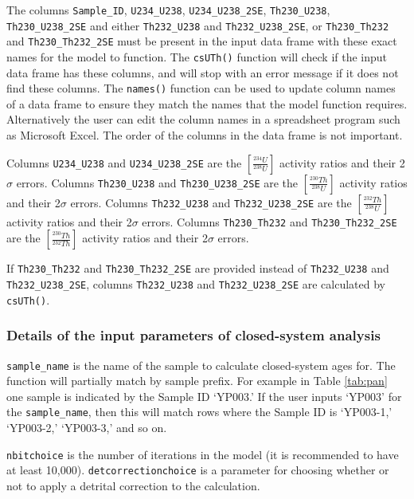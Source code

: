 \documentclass[]{elsarticle} %
\begin{document}
The columns \texttt{Sample\_ID}, \texttt{U234\_U238}, \texttt{U234\_U238\_2SE}, \texttt{Th230\_U238}, \texttt{Th230\_U238\_2SE} and either \texttt{Th232\_U238} and \texttt{Th232\_U238\_2SE}, or \texttt{Th230\_Th232} and \texttt{Th230\_Th232\_2SE} must be present in the input data frame with these exact names for the model to function. The \texttt{csUTh()} function will check if the input data frame has these columns, and will stop with an error message if it does not find these columns. The \texttt{names()} function can be used to update column names of a data frame to ensure they match the names that the model function requires. Alternatively the user can edit the column names in a spreadsheet program such as Microsoft Excel. The order of the columns in the data frame is not important.

Columns \texttt{U234\_U238} and \texttt{U234\_U238\_2SE} are the \([\frac{^{234}U}{^{238}U}]\) activity ratios and their 2\(\sigma\) errors. Columns \texttt{Th230\_U238} and \texttt{Th230\_U238\_2SE} are the \([\frac{^{230}Th}{^{238}U}]\) activity ratios and their 2\(\sigma\) errors. Columns \texttt{Th232\_U238} and \texttt{Th232\_U238\_2SE} are the \([\frac{^{232}Th}{^{238}U}]\) activity ratios and their 2\(\sigma\) errors. Columns \texttt{Th230\_Th232} and \texttt{Th230\_Th232\_2SE} are the \([\frac{^{230}Th}{^{232}Th}]\) activity ratios and their 2\(\sigma\) errors.

If \texttt{Th230\_Th232} and \texttt{Th230\_Th232\_2SE} are provided instead of \texttt{Th232\_U238} and \texttt{Th232\_U238\_2SE}, columns \texttt{Th232\_U238} and \texttt{Th232\_U238\_2SE} are calculated by \texttt{csUTh()}.

\hypertarget{details-of-the-input-parameters-of-closed-system-analysis}{%
\subsubsection{Details of the input parameters of closed-system analysis}\label{details-of-the-input-parameters-of-closed-system-analysis}}

\texttt{sample\_name} is the name of the sample to calculate closed-system ages for. The function will partially match by sample prefix. For example in Table \ref{tab:pan} one sample is indicated by the Sample ID `YP003.' If the user inputs `YP003' for the \texttt{sample\_name}, then this will match rows where the Sample ID is `YP003-1,' `YP003-2,' `YP003-3,' and so on.

\texttt{nbitchoice} is the number of iterations in the model (it is recommended to have at least 10,000).
\texttt{detcorrectionchoice} is a parameter for choosing whether or not to apply a detrital correction to the calculation.
\end{document}
